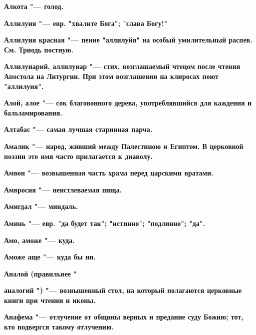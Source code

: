\bfseries Алкота \normalfont{} "--- голод. 




\bfseries Аллилуия \normalfont{} "--- евр. "хвалите Бога"; "слава Богу!" 




\bfseries Аллилуия красная \normalfont{} "--- пение "аллилуйя" на особый умилительный распев. См. Триодь постную. 




\bfseries Аллилуиарий, аллилуиар \normalfont{} "--- стих, возглашаемый чтецом после чтения Апостола на Литургии. При этом возглашении на клиросах поют "аллилуия". 




\bfseries Алой, алое \normalfont{} "--- сок благовонного дерева, употреблявшийся для каждения и бальзамирования. 




\bfseries Алтабас \normalfont{} "--- самая лучшая старинная парча. 




\bfseries Амалик \normalfont{} "--- народ, живший между Палестиною и Египтом. В церковной поэзии это имя часто прилагается к диаволу. 




\bfseries Амвон \normalfont{} "--- возвышенная часть храма перед царскими вратами. 




\bfseries Амвросия \normalfont{} "--- неистлеваемая пища. 




\bfseries Амигдал \normalfont{} "--- миндаль. 




\bfseries Аминь \normalfont{} "--- евр. "да будет так"; "истинно"; "подлинно"; "да". 




\bfseries Амо, аможе \normalfont{} "--- куда. 




\bfseries Аможе аще \normalfont{} "--- куда бы ни. 




\bfseries Аналой \normalfont{} (правильнее " 




\bfseries аналогий \normalfont{}") "--- возвышенный стол, на который полагаются церковные книги при чтении и иконы. 




\bfseries Анафема \normalfont{} "--- отлучение от общины верных и предание суду Божию; тот, кто подвергся такому отлучению. 




